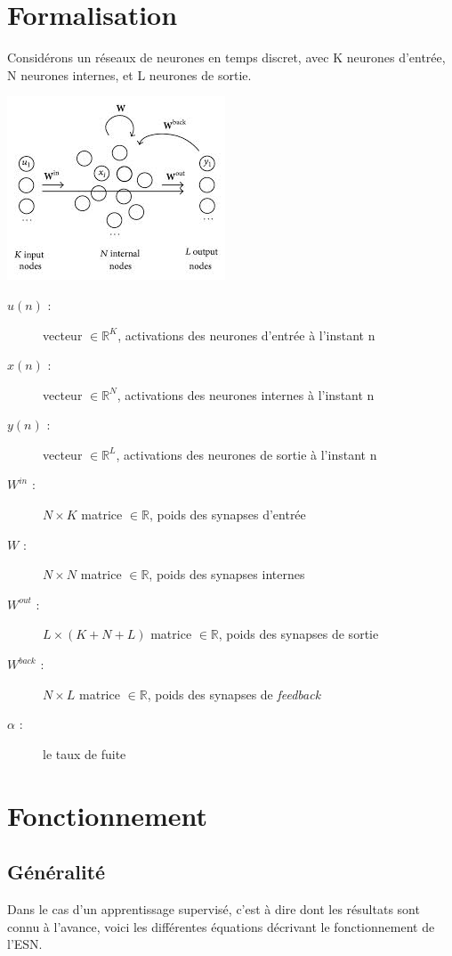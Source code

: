 \documentclass[12pt]{article}
\begin{document}
\section{Formalisation}
Considérons un réseaux de neurones en temps discret, avec K neurones d'entrée, N neurones internes, et L neurones de sortie.\newline
\begin{center}
\includegraphics{esn.jpeg}
\end{center}
\begin{description}
\item[$u(n)$ :] vecteur $\in \mathbb{R}^{K}$, activations des neurones d'entrée à l'instant n
\item[$x(n)$ :] vecteur $\in \mathbb{R}^{N}$, activations des neurones internes à l'instant n
\item[$y(n)$ :] vecteur $\in \mathbb{R}^{L}$, activations des neurones de sortie à l'instant n
\item[$W^{in}$ :] $N \times K$ matrice $\in \mathbb{R}$, poids des synapses d'entrée
\item[$W$ :] $N \times N$ matrice $\in \mathbb{R}$, poids des synapses internes
\item[$W^{out}$ :] $L \times (K + N + L)$ matrice $\in \mathbb{R}$, poids des synapses de sortie
\item[$W^{back}$ :] $N \times L$ matrice $\in \mathbb{R}$, poids des synapses de \textit{feedback}
\item[$\alpha$ :] le taux de fuite
\end{description} 

\section{Fonctionnement}
\subsection{Généralité}
Dans le cas d'un apprentissage supervisé, c'est à dire dont les résultats sont connu à l'avance, voici les différentes équations décrivant le fonctionnement de l'ESN.\newline
\end{document}
